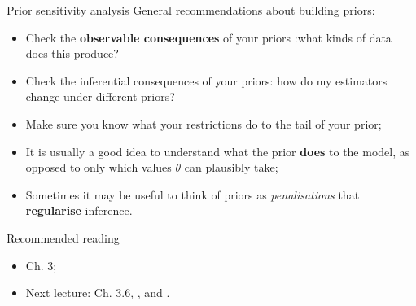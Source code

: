 \begin{frame}{Prior sensitivity analysis}
 General recommendations about building priors:
 \begin{itemize}
  \item Check the \textbf{observable consequences} of your priors :what kinds of data does this produce?
  \item Check the inferential consequences of your priors: how do my estimators change under different priors?
  \item Make sure you know what your restrictions do to the tail of your prior;  
  \item It is usually a good idea to understand what the prior \textbf{does} to the model, as opposed to only which values $\theta$ can plausibly take;
  \item Sometimes it may be useful to think of priors as \textit{penalisations} that \textbf{regularise} inference.
 \end{itemize}
\end{frame}

\begin{frame}{Recommended reading}
\begin{itemize}
 \item[\faBook] \cite{Robert2007} Ch. 3;
 \item[\faForward] Next lecture: \cite{Robert2007} Ch. 3.6, \cite{Seaman2012}, \cite{Gelman2017} and \cite{Simpson2017}.
 \end{itemize} 
\end{frame}
